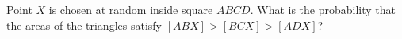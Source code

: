 Point $X$ is chosen at random inside square $ABCD$. What is the probability that the areas of the triangles satisfy $[ABX]>[BCX]>[ADX]$?
